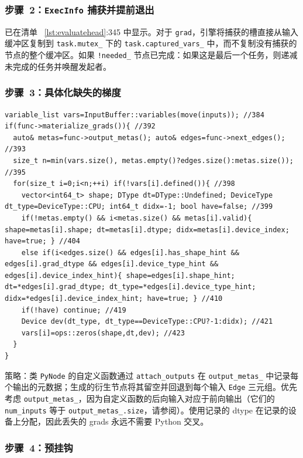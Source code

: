 \subsubsection{步骤~2：\texttt{ExecInfo} 捕获并提前退出}
\label{subsubsec:execinfo}

已在清单 ~\ref{lst:evaluatehead}:345 中显示。对于 \texttt{grad}，引擎将捕获的槽直接从输入缓冲区复制到 \texttt{task.mutex\_} 下的 \texttt{task.captured\_vars\_} 中，而不复制没有捕获的节点的整个缓冲区。如果 \texttt{!needed\_} 节点已完成：如果这是最后一个任务，则递减未完成的任务并唤醒发起者。

\subsubsection{步骤~3：具体化缺失的梯度}
\label{subsubsec:materialize}

\begin{lstlisting}[caption={missing grads.}, label=lst:materialize]
variable_list vars=InputBuffer::variables(move(inputs)); //384
if(func->materialize_grads()){ //392
  auto& metas=func->output_metas(); auto& edges=func->next_edges(); //393
  size_t n=min(vars.size(), metas.empty()?edges.size():metas.size()); //395
  for(size_t i=0;i<n;++i) if(!vars[i].defined()){ //398
    vector<int64_t> shape; DType dt=DType::Undefined; DeviceType dt_type=DeviceType::CPU; int64_t didx=-1; bool have=false; //399
    if(!metas.empty() && i<metas.size() && metas[i].valid){ shape=metas[i].shape; dt=metas[i].dtype; didx=metas[i].device_index; have=true; } //404
    else if(i<edges.size() && edges[i].has_shape_hint && edges[i].grad_dtype && edges[i].device_type_hint && edges[i].device_index_hint){ shape=edges[i].shape_hint; dt=*edges[i].grad_dtype; dt_type=*edges[i].device_type_hint; didx=*edges[i].device_index_hint; have=true; } //410
    if(!have) continue; //419
    Device dev(dt_type, dt_type==DeviceType::CPU?-1:didx); //421
    vars[i]=ops::zeros(shape,dt,dev); //423
  }
}
\end{lstlisting}

策略：类 \texttt{PyNode} 的自定义函数通过 \texttt{attach\_outputs} 在 \texttt{output\_metas\_} 中记录每个输出的元数据；生成的衍生节点将其留空并回退到每个输入 \texttt{Edge} 三元组。优先考虑 \texttt{output\_metas\_}，因为自定义函数的后向输入对应于前向输出（它们的 \texttt{num\_inputs} 等于 \texttt{output\_metas\_.size}，请参阅）。使用记录的 dtype 在记录的设备上分配，因此丢失的 grads 永远不需要 Python 交叉。

\subsubsection{步骤~4：预挂钩}
\label{subsubsec:prehooks}

